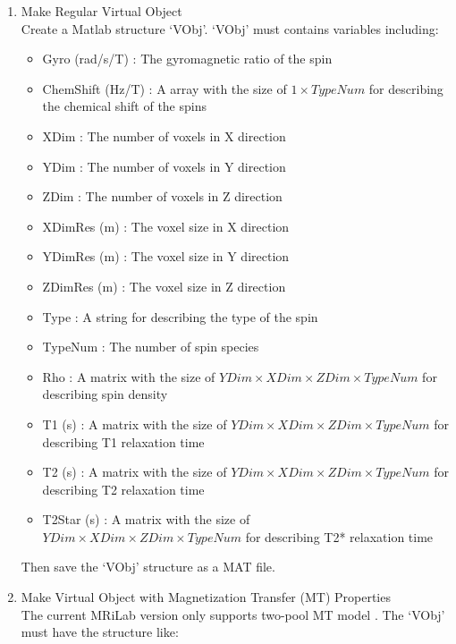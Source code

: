 \documentclass{book}%
\begin{document}
\begin{enumerate}

\item Make Regular Virtual Object \\

Create a Matlab structure `VObj'. `VObj' must contains variables including:

\begin{itemize}
	\item Gyro (rad/s/T) : The gyromagnetic ratio of the spin
	\item ChemShift (Hz/T) : A array with the size of $1 \times TypeNum $ for describing the chemical shift of the spins
	\item XDim : The number of voxels in X direction
	\item YDim : The number of voxels in Y direction
	\item ZDim : The number of voxels in Z direction
	\item XDimRes (m) : The voxel size in X direction
	\item YDimRes (m) : The voxel size in Y direction
	\item ZDimRes (m) : The voxel size in Z direction
	\item Type : A string for describing the type of the spin
	\item TypeNum : The number of spin species
	\item Rho : A matrix with the size of $ YDim \times XDim \times ZDim \times TypeNum $ for describing spin density
	\item T1 (s) : A matrix with the size of $ YDim \times XDim \times ZDim \times TypeNum $ for describing T1 relaxation time
	\item T2 (s) : A matrix with the size of $ YDim \times XDim \times ZDim \times TypeNum $ for describing T2 relaxation time
	\item T2Star (s) : A matrix with the size of $ YDim \times XDim \times ZDim \times TypeNum $ for describing T2* relaxation time
\end{itemize}

Then save the `VObj' structure as a MAT file.

\item Make Virtual Object with Magnetization Transfer (MT) Properties\\

The current MRiLab version only supports two-pool MT model \cite{Yarnykh2002}. The `VObj' must have the structure like:


\end{enumerate}
\end{document}
